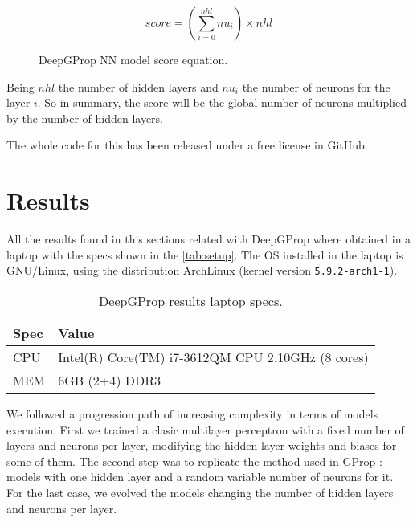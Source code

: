 \documentclass[runningheads]{llncs}
\begin{document}
\begin{figure}
    \centering
    \caption{
        DeepGProp NN model score equation.
    }
    \label{eq:hidden-score}
    \begin{equation}
        score = (\sum_{i=0}^{nhl} nu_{i}) \times nhl
    \end{equation}
\end{figure}

Being $nhl$ the number of hidden layers and $nu_{i}$ the number
of neurons for the layer $i$. So in summary, the score will be the
global number of neurons multiplied by the number of hidden layers.

The whole code for this has been released under a free license in
GitHub. %


\section{Results}
\label{sec:res}


All the results found in this sections related with DeepGProp
\cite{deep-g-prop} where obtained in a laptop with the specs shown in the
\autoref{tab:setup}. The OS installed in the laptop is GNU/Linux, using the
distribution ArchLinux (kernel version \texttt{5.9.2-arch1-1}).

\begin{table}[]
  \centering
  \caption{DeepGProp results laptop specs.}
  \label{tab:setup}
  \begin{tabular}{|l|l|}
  \hline
    Spec & Value                                             \\ \hline
    CPU  & Intel(R) Core(TM) i7-3612QM CPU 2.10GHz (8 cores) \\ \hline
    MEM  & 6GB (2+4) DDR3                                    \\ \hline
  \end{tabular}
\end{table}

We followed a progression path of increasing complexity in terms of models
execution. First we trained a clasic multilayer perceptron with a fixed number
of layers and neurons per layer, modifying the hidden layer weights and biases
for some of them. The second step was to replicate the method used in GProp
\cite{castilloNC,CastilloNPL}: models with one hidden layer and a random
variable number of neurons for it. For the last case, we evolved the models
changing the number of hidden layers and neurons per layer.
\end{document}
